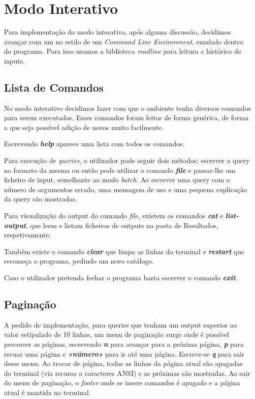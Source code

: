 \documentclass{article}
\begin{document}
    \section{Modo Interativo}
            Para implementação do modo interativo, após alguma discussão, 
            decidimos avançar com um no estilo de um \emph{Command Line 
            Environment}, emulado dentro do programa. 
            Para isso usamos a biblioteca \emph{readline} para leitura e histórico de inputs.
        \subsection{Lista de Comandos}
            No modo interativo decidimos fazer com que o ambiente tenha diversos comandos para serem executados.
            Esses comandos foram feitos de forma genérica, de forma a que seja possível adição de novos muito facilmente.

            \medskip
            Escrevendo \textit{\textbf{help}} aparece uma lista com todos os comandos.

            Para execução de \emph{queries}, o utilizador pode seguir dois métodos: escrever a query
            no formato da mesma ou então pode utilizar o comando \textit{\textbf{file}} e passar-lhe um ficheiro
            de input, semelhante ao modo \textit{batch}. Ao escrever uma query com o número de argumentos
            errado, uma mensagem de uso e uma pequena explicação da query são mostradas.

            Para visualização do output do comando \textit{file}, existem os comandos
            \textit{\textbf{cat}} e \textit{\textbf{list-output}}, que leem e listam ficheiros de outputs
            na pasta de Resultados, respetivamente.

            Também existe o comando \textit{\textbf{clear}} que limpa as linhas do terminal
            e \textit{\textbf{restart}} que recomeça o programa, pedindo um novo catálogo.

            Caso o utilizador pretenda fechar o programa basta escrever o comando \textit{\textbf{exit}}.
    
        \subsection{Paginação}
            A pedido de implementação, para queries que tenham um output superior ao valor estipulado de 10 linhas,
            um menu de paginação surge onde é possível percorrer as páginas, escrevendo \textit{\textbf{n}} para avançar
            para a próxima página, \textit{\textbf{p}} para recuar uma página e \textit{\textbf{«número»}}
            para ir até uma página. Escreve-se \textit{\textbf{q}} para sair desse menu.
            Ao trocar de página, todas as linhas da página atual são apagadas do terminal
            (via recurso a caracteres ANSI) e as próximas são mostradas.
            Ao sair do menu de paginação, o \textit{footer} onde se insere comandos é apagado
            e a página atual é mantida no terminal.
\end{document}
